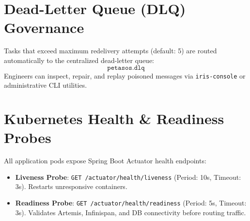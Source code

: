 \section{Dead-Letter Queue (DLQ) Governance}

Tasks that exceed maximum redelivery attempts (default: 5) are routed automatically to the centralized dead-letter queue:
\begin{equation*}
\texttt{petasos.dlq}
\end{equation*}
Engineers can inspect, repair, and replay poisoned messages via \texttt{iris-console} or administrative CLI utilities.

\section{Kubernetes Health \& Readiness Probes}

All application pods expose Spring Boot Actuator health endpoints:
\begin{itemize}
    \item \textbf{Liveness Probe}: \texttt{GET /actuator/health/liveness} (Period: 10s, Timeout: 3s). Restarts unresponsive containers.
    \item \textbf{Readiness Probe}: \texttt{GET /actuator/health/readiness} (Period: 5s, Timeout: 3s). Validates Artemis, Infinispan, and DB connectivity before routing traffic.
\end{itemize}

\newpage
